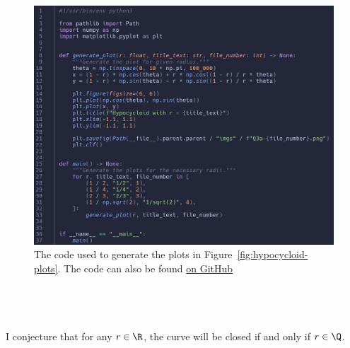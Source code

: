 \documentclass[a4paper]{article}
\begin{document}
\begin{figure}[h]
	\centering
	\includegraphics[scale=0.3]{Q3a-code}
	\caption{The code used to generate the plots in Figure~\ref{fig:hypocycloid-plots}. The code can also be found \href{https://github.com/DoctorDalek1963/uni/blob/fe244f6880c7df0d801d426ca7ef9149b585ec2f/first-year/MA144-Methods-of-Mathematical-Modelling-2/Ass 1/code/generate_plots.py}{on GitHub}}
\end{figure}

\subsection{~}

I conjecture that for any $r \in \R$, the curve will be closed if and only if $r \in \Q$.
\end{document}
